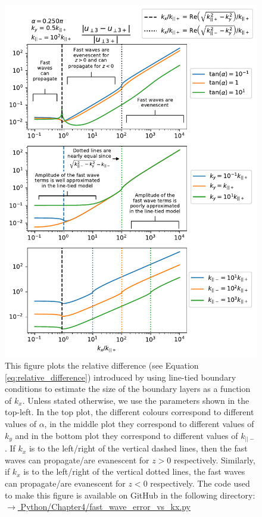 \begin{figure}
    \centering
    \vspace{-25pt}
    \includegraphics[width=\textwidth,height=0.89\textheight,keepaspectratio]{figures/chapter04/fast_wave_error_vs_kx.pdf}
    \vspace{-10pt}
    \caption{This figure plots the relative difference (see Equation \ref{eq:relative_difference}) introduced by using line-tied boundary conditions to estimate the size of the boundary layers as a function of $k_x$. Unless stated otherwise, we use the parameters shown in the top-left. In the top plot, the different colours correspond to different values of $\alpha$, in the middle plot they correspond to different values of $k_y$ and in the bottom plot they correspond to different values of $k_{||-}$. If $k_x$ is to the left/right of the vertical dashed lines, then the fast waves can propagate/are evanescent for $z>0$ respectively. Similarly, if $k_x$ is to the left/right of the vertical dotted lines, the fast waves can propagate/are evanescent for $z<0$ respectively. The code used to make this figure is available on GitHub in the following directory:\newline
    \href{https://github.com/aleksyprok/apkp_thesis/blob/main/Python/Chapter4/fast_wave_error_vs_kx.py}{$\rightarrow$ Python/Chapter4/fast\_wave\_error\_vs\_kx.py}}
    \label{fig:fast_wave_error_vs_kx}
    \vspace{-20pt}
\end{figure}

